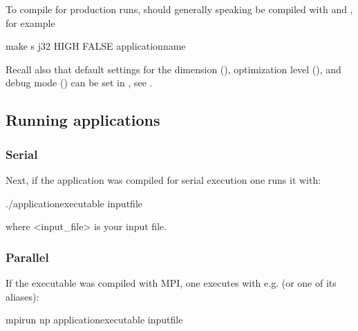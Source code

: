 \documentclass[letterpaper,10pt,english]{sphinxmanual}
\begin{document}
\sphinxAtStartPar
To compile for production runs,  should generally speaking be compiled with  and , for example

\begin{sphinxVerbatim}[commandchars=\\\{\},formatcom=\scriptsize]
make \PYGZhy{}s \PYGZhy{}j32  HIGH FALSE \PYGZlt{}application\PYGZus{}name\PYGZgt{}
\end{sphinxVerbatim}

\sphinxAtStartPar
Recall also that default settings for the dimension (), optimization level (), and debug mode () can be set in , see .


\subsection{Running applications}
\label{\detokenize{Base/Control:running-applications}}

\subsubsection{Serial}
\label{\detokenize{Base/Control:serial}}
\sphinxAtStartPar
Next, if the application was compiled for serial execution one runs it with:

\begin{sphinxVerbatim}[commandchars=\\\{\},formatcom=\scriptsize]
./\PYGZlt{}application\PYGZus{}executable\PYGZgt{} \PYGZlt{}input\PYGZus{}file\PYGZgt{}
\end{sphinxVerbatim}

\sphinxAtStartPar
where \textless{}input\_file\textgreater{} is your input file.


\subsubsection{Parallel}
\label{\detokenize{Base/Control:parallel}}
\sphinxAtStartPar
If the executable was compiled with MPI, one executes with e.g.  (or one of its aliases):

\begin{sphinxVerbatim}[commandchars=\\\{\},formatcom=\scriptsize]
mpirun \PYGZhy{}np  \PYGZlt{}application\PYGZus{}executable\PYGZgt{} \PYGZlt{}input\PYGZus{}file\PYGZgt{}
\end{sphinxVerbatim}
\end{document}
